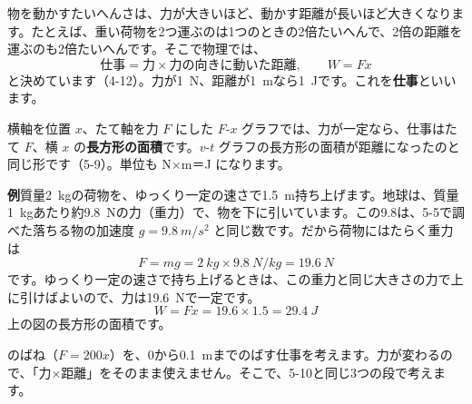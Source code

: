 

\label{bk:5-12:shigoto}物を動かすたいへんさは、力が大きいほど、動かす距離が長いほど大きくなります。たとえば、重い荷物を2つ運ぶのは1つのときの2倍たいへんで、2倍の距離を運ぶのも2倍たいへんです。そこで物理では、
\[ \text{仕事}=\text{力}\times\text{力の向きに動いた距離},\qquad W=Fx \]
と決めています（4-12）。力が\qty{1}{N}、距離が\qty{1}{m}なら\qty{1}{J}です。これを\textbf{仕事}といいます。

\noindent\begin{minipage}[c]{0.46\linewidth}
\end{minipage}\hfill
\begin{minipage}[c]{0.52\linewidth}\raggedright
横軸を位置 $x$、たて軸を力 $F$ にした $F$-$x$ グラフでは、力が一定なら、仕事はたて $F$、横 $x$ の\textbf{長方形の面積}です。$v$-$t$ グラフの長方形の面積が距離になったのと同じ形です（5-9）。単位も N×m＝J になります。
\end{minipage}

\noindent\textbf{例}\quad 質量\qty{2}{kg}の荷物を、ゆっくり一定の速さで\qty{1.5}{m}持ち上げます。地球は、質量\qty{1}{kg}あたり約\qty{9.8}{N}の力（重力）で、物を下に引いています。この9.8は、5-5で調べた落ちる物の加速度 $g=\qty{9.8}{m/s^2}$ と同じ数です。だから荷物にはたらく重力は
\[ F=mg=\qty{2}{kg}\times\qty{9.8}{N/kg}=\qty{19.6}{N} \]
です。ゆっくり一定の速さで持ち上げるときは、この重力と同じ大きさの力で上に引けばよいので、力は\qty{19.6}{N}で一定です。
\[ W=Fx=19.6\times1.5=\qty{29.4}{J} \]
上の図の長方形の面積です。


\label{bk:5-12:sekibun}\bkyattemiyouref のばね（$F=200x$）を、0から\qty{0.1}{m}までのばす仕事を考えます。力が変わるので、「力×距離」をそのまま使えません。そこで、5-10と同じ3つの段で考えます。

